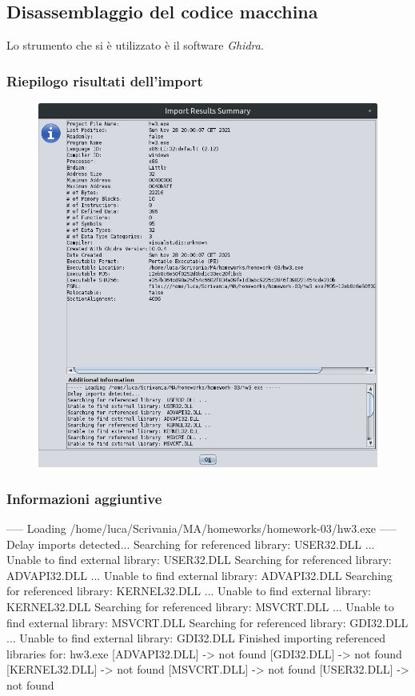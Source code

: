 \documentclass[a4paper, 12pt]{article}
\begin{document}
\subsection{Disassemblaggio del codice macchina}
Lo strumento che si è utilizzato è il software \emph{Ghidra}.

\subsubsection{Riepilogo risultati dell'import}
\begin{figure}[H]
\centering\includegraphics[width=\textwidth]{import}
\end{figure}


\subsubsection{Informazioni aggiuntive}
\begin{spverbatim}
----- Loading /home/luca/Scrivania/MA/homeworks/homework-03/hw3.exe -----
Delay imports detected...
Searching for referenced library: USER32.DLL ...
Unable to find external library: USER32.DLL
Searching for referenced library: ADVAPI32.DLL ...
Unable to find external library: ADVAPI32.DLL
Searching for referenced library: KERNEL32.DLL ...
Unable to find external library: KERNEL32.DLL
Searching for referenced library: MSVCRT.DLL ...
Unable to find external library: MSVCRT.DLL
Searching for referenced library: GDI32.DLL ...
Unable to find external library: GDI32.DLL
Finished importing referenced libraries for: hw3.exe
  [ADVAPI32.DLL] -> not found
  [GDI32.DLL] -> not found
  [KERNEL32.DLL] -> not found
  [MSVCRT.DLL] -> not found
  [USER32.DLL] -> not found
\end{spverbatim}
\end{document}
